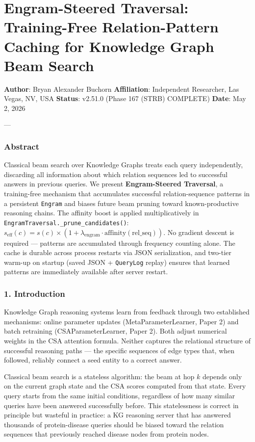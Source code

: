 \section{Engram-Steered Traversal: Training-Free Relation-Pattern Caching for Knowledge Graph Beam Search}

\textbf{Author}: Bryan Alexander Buchorn  
\textbf{Affiliation}: Independent Researcher, Las Vegas, NV, USA  
\textbf{Status}: v2.51.0 (Phase 167 (STRB) COMPLETE)
\textbf{Date}: May 2, 2026

---

\subsubsection{Abstract}
Classical beam search over Knowledge Graphs treats each query indep\-endently, discarding all information about which relation sequences led to successful answers in previous queries. We present \textbf{Engram-Steered Traversal}, a training-free mechanism that accumulates successful relation-sequence patterns in a persistent \texttt{Engram} and biases future beam pruning toward known-productive reasoning chains. The affinity boost is applied multi\-plicatively in \texttt{EngramTraversal.\_prune\_candidates()}: $s_\text{eff}(c) = s(c) \times (1 + \lambda_\text{engram} \cdot \text{affinity}(\text{rel\_seq}))$. No gradient descent is required — patterns are accumulated through frequency counting alone. The cache is durable across process restarts via JSON seria\-lization, and two-tier warm-up on startup (saved JSON + \texttt{QueryLog} replay) ensures that learned patterns are immediately available after server restart.

\subsubsection{1. Introd\-uction}
Knowledge Graph reasoning systems learn from feedback through two established mechanisms: online parameter updates (MetaParameterLearner, Paper 2) and batch retraining (CSAParameterLearner, Paper 2). Both adjust numerical weights in the CSA attention formula. Neither captures the relational structure of successful reasoning paths — the specific sequences of edge types that, when followed, reliably connect a seed entity to a correct answer.

Classical beam search \cite{vaswani2017attention} is a stateless algorithm: the beam at hop $k$ depends only on the current graph state and the CSA scores computed from that state. Every query starts from the same initial conditions, regardless of how many similar queries have been answered succe\-ssfully before. This state\-lessness is correct in principle but wasteful in practice: a KG reasoning server that has answered thousands of protein-disease queries should be biased toward the relation sequences that previously reached disease nodes from protein nodes.

